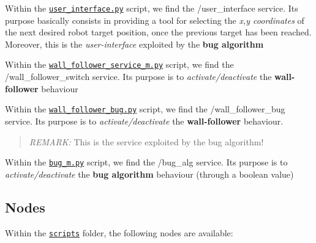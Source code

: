 \begin{DoxyEnumerate}
\item Within the \href{https://github.com/fedehub/final_assignment/tree/main/scripts/user_interface.py}{\tt user\+\_\+interface.\+py} script, we find the {\ttfamily /user\+\_\+interface service}. Its purpose basically consists in providing a tool for selecting the {\itshape x,y coordinates} of the next desired robot target position, once the previous target has been reached. Moreover, this is the {\itshape user-\/interface} exploited by the {\bfseries bug algorithm}
\item Within the \href{https://github.com/fedehub/final_assignment/tree/main/scripts/wall_follower_service_m.py}{\tt wall\+\_\+follower\+\_\+service\+\_\+m.\+py} script, we find the {\ttfamily /wall\+\_\+follower\+\_\+switch} service. Its purpose is to {\itshape activate/deactivate} the {\bfseries wall-\/follower} behaviour
\item Within the \href{https://github.com/fedehub/final_assignment/tree/main/scripts/wall_follower_bug.py}{\tt wall\+\_\+follower\+\_\+bug.\+py} script, we find the {\ttfamily /wall\+\_\+follower\+\_\+bug} service. Its purpose is to {\itshape activate/deactivate} the {\bfseries wall-\/follower} behaviour. \begin{quote}
{\itshape R\+E\+M\+A\+RK\+:} This is the service exploited by the {\ttfamily bug algorithm}! \end{quote}

\item Within the \href{https://github.com/fedehub/final_assignment/tree/main/scripts/bug_m.py}{\tt bug\+\_\+m.\+py} script, we find the {\ttfamily /bug\+\_\+alg} service. Its purpose is to {\itshape activate/deactivate} the {\bfseries bug algorithm} behaviour (through a boolean value)
\end{DoxyEnumerate}

\subsection*{Nodes}

Within the \href{https://github.com/fedehub/final_assignment/tree/main/scripts}{\tt scripts} folder, the following nodes are available\+:



